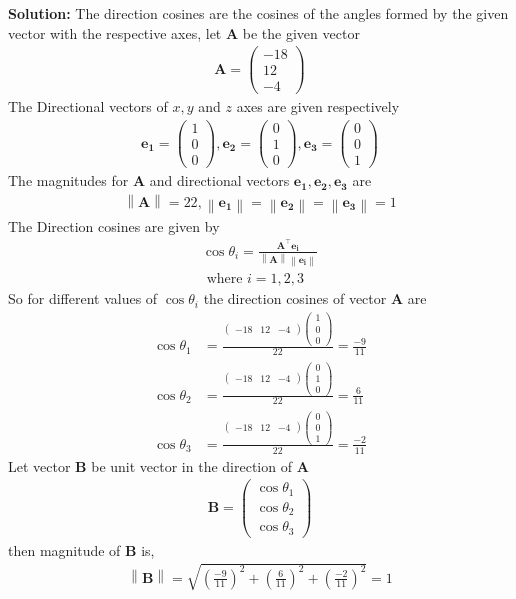 \documentclass[12pt]{article}
\providecommand{\brak}[1]{\ensuremath{\left(#1\right)}}
\providecommand{\norm}[1]{\left\lVert#1\right\rVert}
\newcommand{\solution}{\noindent \textbf{Solution: }}
\newcommand{\myvec}[1]{\ensuremath{\begin{pmatrix}#1\end{pmatrix}}}
\let\vec\mathbf
\begin{document}
\begin{enumerate}
\solution The direction cosines are the cosines of the angles formed by the given vector with the respective axes, let $\vec{A}$ be the given vector
\begin{align}
	\vec{A} =\myvec{-18\\12\\-4}
\end{align}
The Directional vectors of $x,y$ and $z$ axes are given respectively 
\begin{align}
		\vec{e_1} =\myvec{1\\0\\0},\vec{e_2}=\myvec{0\\1\\0},\vec{e_3} =\myvec{0\\0\\1}
\end{align}
		The magnitudes for $\vec{A}$ and directional vectors $\vec{e_1},\vec{e_2},\vec{e_3}$ are
	\begin{align}
\norm{\vec{A}} =22,\norm{\vec{e_1}}=\norm{\vec{e_2}}=\norm{\vec{e_3}}=1
	\end{align}
The Direction cosines are given by
\begin{align}
	\cos\theta_i=\frac{\vec{A}^\top\vec{e_i}}{\norm{\vec{A}}\norm{\vec{e_i}}}\\
	\text{ where }i=1,2,3  
\end{align}
		So for different values of $\cos\theta_i$ the direction cosines of vector $\vec{A}$ are
\begin{align}
	\cos\theta_1 &=\frac{\myvec{-18&12&-4}\myvec{1\\0\\0}}{22}=\frac{-9}{11}\\
	\cos\theta_2 &=\frac{\myvec{-18&12&-4}\myvec{0\\1\\0}}{22}=\frac{6}{11}\\
	\cos\theta_3 &=\frac{\myvec{-18&12&-4}\myvec{0\\0\\1}}{22}=\frac{-2}{11}
\end{align}
		Let vector $\vec{B}$ be unit vector in the direction of $\vec{A}$
		\begin{align}
			\vec{B}=\myvec{\cos\theta_1\\\cos\theta_2\\\cos\theta_3}
		\end{align}
		then magnitude of $\vec{B}$ is,
		\begin{align}
			\norm{\vec{B}} =\sqrt{\brak{\frac{-9}{11}}^2+\brak{\frac{6}{11}}^2+\brak{\frac{-2}{11}}^2}=1
		\end{align}
\end{enumerate}
\end{document}
